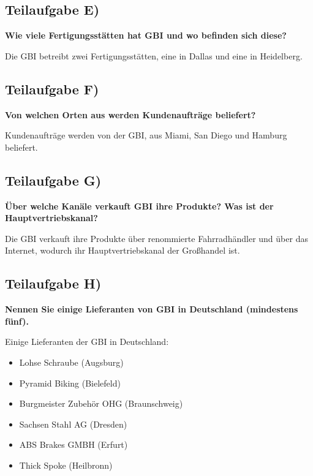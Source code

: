 \subsection{Teilaufgabe E)}
\textbf{Wie viele Fertigungsstätten hat GBI und wo befinden sich diese?}

\textnormal{Die GBI betreibt zwei Fertigungsstätten, eine in Dallas und eine in
Heidelberg.}

\subsection{Teilaufgabe F)}
\textbf{Von welchen Orten aus werden Kundenaufträge beliefert?}

\textnormal{Kundenaufträge werden von der GBI, aus Miami, San Diego und Hamburg
beliefert.}

\subsection{Teilaufgabe G)}
\textbf{Über welche Kanäle verkauft GBI ihre Produkte? Was ist der Hauptvertriebskanal?}

\textnormal{Die GBI verkauft ihre Produkte über renommierte Fahrradhändler und
über das Internet, wodurch ihr Hauptvertriebskanal der Großhandel ist.}

\subsection{Teilaufgabe H)}
\textbf{Nennen Sie einige Lieferanten von GBI in Deutschland (mindestens fünf).}

\textnormal{Einige Lieferanten der GBI in Deutschland:}
\begin{itemize}
  \item Lohse Schraube (Augsburg)
  \item Pyramid Biking (Bielefeld)
  \item Burgmeister Zubehör OHG (Braunschweig)
  \item Sachsen Stahl AG (Dresden)
  \item ABS Brakes GMBH (Erfurt)
  \item Thick Spoke (Heilbronn)
\end{itemize}


